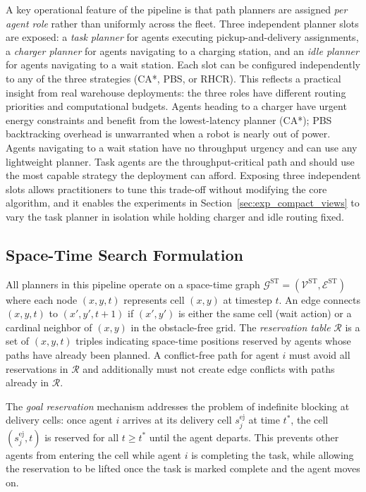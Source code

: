 A key operational feature of the pipeline is that path planners are
assigned \emph{per agent role} rather than uniformly across the fleet.
Three independent planner slots are exposed:
a \emph{task planner} for agents executing pickup-and-delivery assignments,
a \emph{charger planner} for agents navigating to a charging station, and
an \emph{idle planner} for agents navigating to a wait station.
Each slot can be configured independently to any of the three strategies
(CA*, PBS, or RHCR).
This reflects a practical insight from real warehouse deployments: the
three roles have different routing priorities and computational budgets.
Agents heading to a charger have urgent energy constraints and benefit from
the lowest-latency planner (CA*); PBS backtracking overhead is unwarranted
when a robot is nearly out of power.
Agents navigating to a wait station have no throughput urgency and can use
any lightweight planner.
Task agents are the throughput-critical path and should use the most capable
strategy the deployment can afford.
Exposing three independent slots allows practitioners to tune this
trade-off without modifying the core algorithm, and it enables the
experiments in Section~\ref{sec:exp_compact_views} to vary the task planner in
isolation while holding charger and idle routing fixed.


\subsection{Space-Time Search Formulation}
\label{subsec:method_spacetime}

All planners in this pipeline operate on a space-time graph
$\mathcal{G}^{\text{ST}} = (\mathcal{V}^{\text{ST}}, \mathcal{E}^{\text{ST}})$
where each node $(x, y, t)$ represents cell $(x, y)$ at timestep $t$.
An edge connects $(x, y, t)$ to $(x', y', t+1)$ if $(x', y')$ is either the
same cell (wait action) or a cardinal neighbor of $(x, y)$ in the
obstacle-free grid.
The \emph{reservation table} $\mathcal{R}$ is a set of
$(x, y, t)$ triples indicating space-time positions reserved by agents whose
paths have already been planned.
A conflict-free path for agent $i$ must avoid all reservations in
$\mathcal{R}$ and additionally must not create edge conflicts with paths already
in $\mathcal{R}$.

The \emph{goal reservation} mechanism addresses the problem of indefinite
blocking at delivery cells: once agent $i$ arrives at its delivery cell
$s_j^{\text{ej}}$ at time $t^*$, the cell $(s_j^{\text{ej}}, t)$ is reserved
for all $t \geq t^*$ until the agent departs.
This prevents other agents from entering the cell while agent $i$ is completing
the task, while allowing the reservation to be lifted once the task is marked
complete and the agent moves on.

